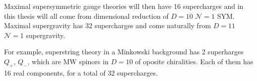 Maximal supersymmetric gauge theories will then have 16 supercharges and in this thesis will all come from dimensional reduction of $D = 10$ $\mathcal{N} = 1$ SYM. Maximal supergravity has 32 supercharges and come naturally from $D = 11$ $\mathcal{N} = 1$ supergravity.


For example, superstring theory in a Minkowski background has 2 superharges $Q_+$, $Q_-$, which are MW spinors in $D = 10$ of oposite chiralities. Each of them has 16 real components, for a total of 32 supercharges.

